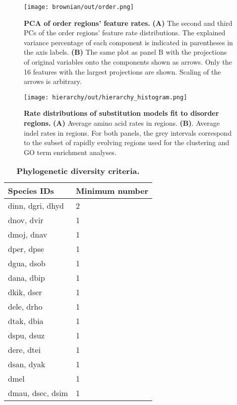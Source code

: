 \begin{figure}[h!]
\texttt{[image: brownian/out/order.png]}
\centering
\caption{\textbf{PCA of order regions' feature rates.}
\textbf{(A)} The second and third PCs of the order regions' feature rate distributions. The explained variance percentage of each component is indicated in parentheses in the axis labels. \textbf{(B)} The same plot as panel B with the projections of original variables onto the components shown as arrows. Only the 16 features with the largest projections are shown. Scaling of the arrows is arbitrary.}
\label{sfig:order}
\end{figure}

\begin{figure}[h!]
\texttt{[image: hierarchy/out/hierarchy\_histogram.png]}
\centering
\caption{\textbf{Rate distributions of substitution models fit to disorder regions.}
\textbf{(A)} Average amino acid rates in regions. \textbf{(B)}. Average indel rates in regions. For both panels, the grey intervals correspond to the subset of rapidly evolving regions used for the clustering and GO term enrichment analyses.}
\label{sfig:hierarchy_histogram}
\end{figure}

\clearpage  %

\begin{table}[h!]
\centering
\caption{\textbf{Phylogenetic diversity criteria.}}
\label{stable:diversity_criteria}
\begin{tabular}{|l|l|}
\hline
\textbf{Species IDs}   & \textbf{Minimum number}   \\ \hline
dinn,   dgri, dhyd     & 2                         \\ \hline
dnov,   dvir           & 1                         \\ \hline
dmoj,   dnav           & 1                         \\ \hline
dper,   dpse           & 1                         \\ \hline
dgua,   dsob           & 1                         \\ \hline
dana,   dbip           & 1                         \\ \hline
dkik,   dser           & 1                         \\ \hline
dele,   drho           & 1                         \\ \hline
dtak,   dbia           & 1                         \\ \hline
dspu,   dsuz           & 1                         \\ \hline
dere,   dtei           & 1                         \\ \hline
dsan,   dyak           & 1                         \\ \hline
dmel                   & 1                         \\ \hline
dmau,   dsec, dsim     & 1                         \\ \hline
\end{tabular}
\end{table}

